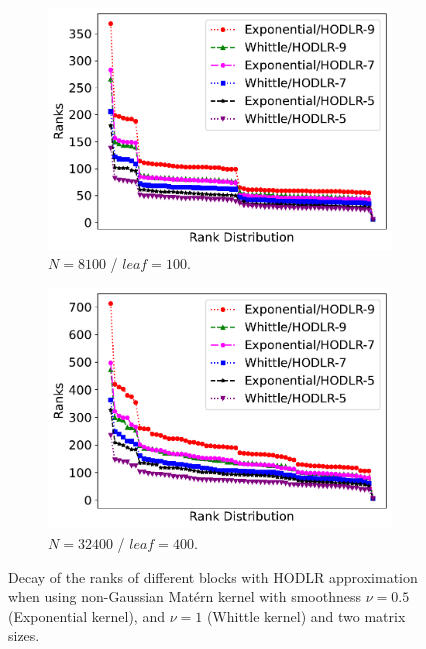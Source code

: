 \documentclass[conference]{IEEEtran}
\begin{document}
\begin{figure}
     \centering
     \begin{subfigure}[b]{0.23\textwidth}
         \centering
         \includegraphics[width=\textwidth]{./figures/ranks-decay-8100-hodlr.pdf}
         \caption{$N = 8100$ / $leaf = 100$.}
         \label{fig:hodlr-decay-8100}
     \end{subfigure}
     \begin{subfigure}[b]{0.23\textwidth}
         \centering
         \includegraphics[width=\textwidth]{./figures/ranks-decay-32400-hodlr.pdf}
         \caption{$N = 32400$ / $leaf = 400$.}
         \label{fig:hodlr-decay-32400}
     \end{subfigure}
        \caption{Decay of the ranks of different blocks with HODLR approximation when using non-Gaussian Mat\'ern kernel with smoothness $\nu =0.5$ (Exponential kernel), and $\nu=1$ (Whittle kernel) and two matrix sizes.}
        \label{fig:hodlr-decay}
\end{figure}
\end{document}
